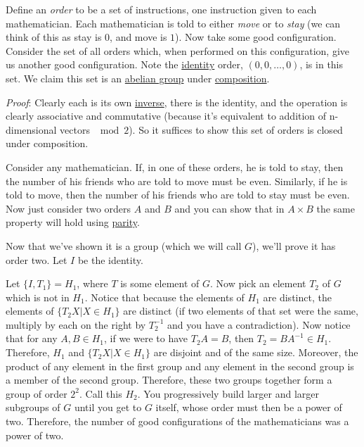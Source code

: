 \begin{enumerate}
Define an \textit{order} to be a set of instructions, one instruction given to each mathematician.  Each mathematician is told to either \textit{move} or to \textit{stay} (we can think of this as stay is $0$, and move is $1$).  Now take some good configuration.  Consider the set of all orders which, when performed on this configuration, give us another good configuration.  Note the \href{https://artofproblemsolving.com/wiki/index.php?title=Identity}{identity} order, $(0, 0, \ldots, 0)$, is in this set. We claim this set is an \href{https://artofproblemsolving.com/wiki/index.php?title=Abelian\_group}{abelian group} under \href{https://artofproblemsolving.com/wiki/index.php?title=Composition}{composition}.

 \textit{Proof}: Clearly each is its own \href{https://artofproblemsolving.com/wiki/index.php?title=Inverse}{inverse}, there is the identity, and the operation is clearly associative and commutative (because it's equivalent to addition of n-dimensional vectors $\mod{2}$).  So it suffices to show this set of orders is closed under composition.

 Consider any mathematician.  If, in one of these orders, he is told to stay, then the number of his friends who are told to move must be even.  Similarly, if he is told to move, then the number of his friends who are told to stay must be even.  Now just consider two orders $A$ and $B$ and you can show that in $A \times B$ the same property will hold using \href{https://artofproblemsolving.com/wiki/index.php?title=Parity}{parity}.

 Now that we've shown it is a group (which we will call $G$), we'll prove it has order two.  Let $I$ be the identity.

 Let $\{I, T_1\} = H_1$, where $T$ is some element of $G$.  Now pick an element $T_2$ of $G$ which is not in $H_1$.  Notice that because the elements of $H_1$ are distinct, the elements of $\{T_2X|X \in H_1\}$ are distinct (if two elements of that set were the same, multiply by each on the right by $T_2^{ - 1}$ and you have a contradiction).  Now notice that for any $A, B \in H_1$, if we were to have $T_2A = B$, then $T_2 = BA^{ - 1} \in H_1$.  Therefore, $H_1$ and $\{T_2X|X \in H_1\}$ are disjoint and of the same size.  Moreover, the product of any element in the first group and any element in the second group is a member of the second group.  Therefore, these two groups together form a group of order $2^2$.  Call this $H_2$. You progressively build larger and larger subgroups of $G$ until you get to $G$ itself, whose order must then be a power of two.  Therefore, the number of good configurations of the mathematicians was a power of two.


\end{enumerate}
